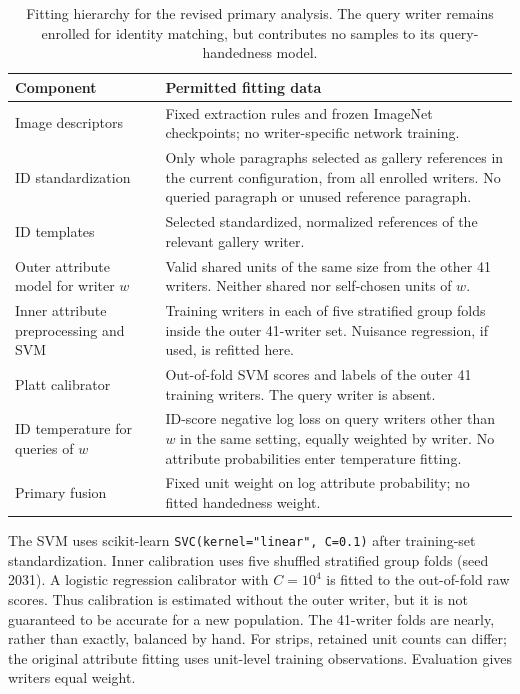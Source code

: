 \documentclass[10pt,a4paper]{article}
\begin{document}
\begin{table}[ht]
\caption{Fitting hierarchy for the revised primary analysis. The query writer remains enrolled for identity matching, but contributes no samples to its query-handedness model.}\label{tab:nesting}
\centering\small
\begin{tabularx}{\textwidth}{p{}X}\toprule
Component & Permitted fitting data\\\midrule
Image descriptors & Fixed extraction rules and frozen ImageNet checkpoints; no writer-specific network training.\\
ID standardization & Only whole paragraphs selected as gallery references in the current configuration, from all enrolled writers. No queried paragraph or unused reference paragraph.\\
ID templates & Selected standardized, normalized references of the relevant gallery writer.\\
Outer attribute model for writer $w$ & Valid shared units of the same size from the other 41 writers. Neither shared nor self-chosen units of $w$.\\
Inner attribute preprocessing and SVM & Training writers in each of five stratified group folds inside the outer 41-writer set. Nuisance regression, if used, is refitted here.\\
Platt calibrator & Out-of-fold SVM scores and labels of the outer 41 training writers. The query writer is absent.\\
ID temperature for queries of $w$ & ID-score negative log loss on query writers other than $w$ in the same setting, equally weighted by writer. No attribute probabilities enter temperature fitting.\\
Primary fusion & Fixed unit weight on log attribute probability; no fitted handedness weight.\\\bottomrule
\end{tabularx}
\end{table}

The SVM uses scikit-learn \texttt{SVC(kernel="linear", C=0.1)} after training-set standardization. Inner calibration uses five shuffled stratified group folds (seed 2031). A logistic regression calibrator with $C=10^4$ is fitted to the out-of-fold raw scores. Thus calibration is estimated without the outer writer, but it is not guaranteed to be accurate for a new population. The 41-writer folds are nearly, rather than exactly, balanced by hand. For strips, retained unit counts can differ; the original attribute fitting uses unit-level training observations. Evaluation gives writers equal weight.
\end{document}
